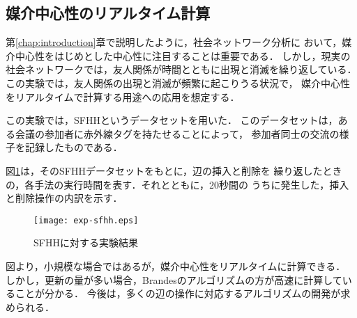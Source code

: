 \subsection{媒介中心性のリアルタイム計算}
\label{subsect:exp-sfhh}

第\ref{chap:introduction}章で説明したように，社会ネットワーク分析に
おいて，媒介中心性をはじめとした中心性に注目することは重要である．
しかし，現実の社会ネットワークでは，友人関係が時間とともに出現と消滅を繰り返している．
この実験では，友人関係の出現と消滅が頻繁に起こりうる状況で，
媒介中心性をリアルタイムで計算する用途への応用を想定する．

この実験では，SFHH\cite{Genois2018}というデータセットを用いた．
このデータセットは，ある会議の参加者に赤外線タグを持たせることによって，
参加者同士の交流の様子を記録したものである．

図\ref{fig:exp-sfhh}は，そのSFHHデータセットをもとに，辺の挿入と削除を
繰り返したときの，各手法の実行時間を表す．それとともに，20秒間の
うちに発生した，挿入と削除操作の内訳を示す．

\begin{figure}[tb]
  \centering
  \texttt{[image: exp-sfhh.eps]}
  \caption{SFHHに対する実験結果}
  \label{fig:exp-sfhh}
\end{figure}

図より，小規模な場合ではあるが，媒介中心性をリアルタイムに計算できる．
しかし，更新の量が多い場合，Brandesのアルゴリズムの方が高速に計算していることが分かる．
今後は，多くの辺の操作に対応するアルゴリズムの開発が求められる．
